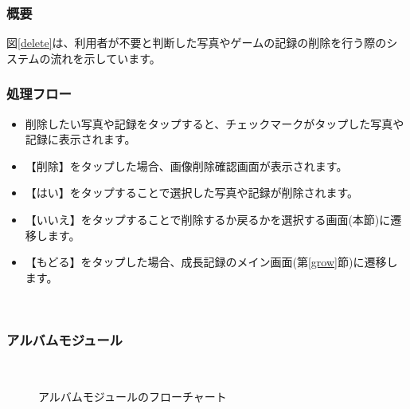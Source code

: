 \documentclass[a4j]{jarticle}
\begin{document}
\subsubsection*{概要}
図\ref{delete}は、利用者が不要と判断した写真やゲームの記録の削除を行う際のシステムの流れを示しています。

\subsubsection*{処理フロー}
\begin{itemize}
\item 削除したい写真や記録をタップすると、チェックマークがタップした写真や記録に表示されます。
\item 【削除】をタップした場合、画像削除確認画面が表示されます。
\item 【はい】をタップすることで選択した写真や記録が削除されます。
\item 【いいえ】をタップすることで削除するか戻るかを選択する画面(本節)に遷移します。
\item 【もどる】をタップした場合、成長記録のメイン画面(第\ref{grow}節)に遷移します。
\end{itemize}

\newpage　

\subsubsection{アルバムモジュール\label{Albam}}
　　　　　　　　　　　　　　　　　　　　　　　
\begin{figure}[H]
    \begin{center}
    \caption {アルバムモジュールのフローチャート}
    \label{albam}
    \end{center}
\end{figure}
\end{document}
